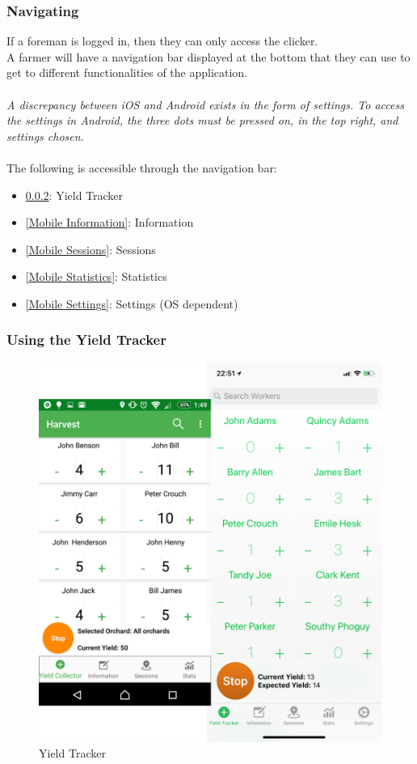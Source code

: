 \documentclass[11pt]{article}
\begin{document}
\subsubsection{Navigating}
If a foreman is logged in, then they can only access the clicker.\\
A farmer will have a navigation bar displayed at the bottom that they can use to get to different functionalities of the application.\\
\\
\textit{A discrepancy between iOS and Android exists in the form of settings. To access the settings in Android, the three dots must be pressed on, in the top right, and settings chosen.}\\
\\
The following is accessible through the navigation bar:
\begin{itemize}
\item \ref{Mobile Yield Tracker}: Yield Tracker
\item \ref{Mobile Information}: Information
\item \ref{Mobile Sessions}: Sessions
\item \ref{Mobile Statistics}: Statistics
\item \ref{Mobile Settings}: Settings (OS dependent)
\end{itemize}
\subsubsection{Using the Yield Tracker}
\label{Mobile Yield Tracker}

\begin{figure}
 \centering
 \includegraphics[width=12cm, keepaspectratio]{Images/mobileClicker.png}
 \caption{Yield Tracker}
 \label{Yield Tracker}
\end{figure}
\end{document}
